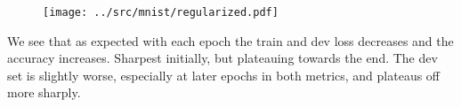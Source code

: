 %
%
\begin{answer}
\begin{figure}[H]
\texttt{[image: ../src/mnist/regularized.pdf]}
\end{figure}
We see that as expected with each epoch the train and dev loss decreases and the accuracy increases. Sharpest initially, but plateauing towards the end. The dev set is slightly worse, especially at later epochs in both metrics, and plateaus off more sharply.

\end{answer}
%


